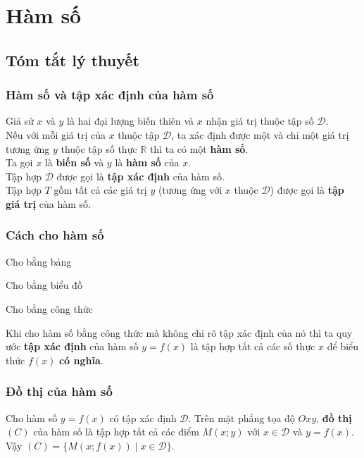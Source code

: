 \section{Hàm số}

\subsection{Tóm tắt lý thuyết}
\subsubsection{Hàm số và tập xác định của hàm số}
\begin{dn}{}
	Giả sử $x$ và $y$ là hai đại lượng biến thiên và $x$ nhận giá trị thuộc tập số $\mathscr{D}$.\\
	Nếu với mỗi giá trị của $x$ thuộc tập $\mathscr{D}$, ta xác định được một và chỉ một giá trị tương ứng $y$ thuộc tập số thực $\mathbb{R}$ thì ta có một \textbf{hàm số}. \\
	Ta gọi $x$ là \textbf{biến số} và $y$ là \textbf{hàm số} của $x$.\\
	Tập hợp $\mathscr{D}$ được gọi là \textbf{tập xác định} của hàm số.\\
	Tập hợp $T$ gồm tất cả các giá trị $y$ (tương ứng với $x$ thuộc $\mathscr{D}$) được gọi là \textbf{tập giá trị} của hàm số.
\end{dn}

\subsubsection{Cách cho hàm số}

\begin{listEX}[3]
	\item Cho bằng bảng
	\item Cho bằng biểu đồ
	\item Cho bằng công thức
\end{listEX}

\begin{note}
	Khi cho hàm số bằng công thức mà không chỉ rõ tập xác định của nó thì ta quy ước \textbf{tập xác định} của hàm số $y=f(x)$ là tập hợp tất cả các số thực $x$ để biểu thức $f(x)$ \textbf{có nghĩa}.
\end{note}

\subsubsection{Đồ thị của hàm số}
\begin{dn}{}
	Cho hàm số $y=f(x)$ có tập xác định $\mathscr{D}$. Trên mặt phẳng tọa độ $Oxy$, \textbf{đồ thị} $(C)$ của hàm số là tập hợp tất cả các điểm $M(x;y)$ với $x\in\mathscr{D}$ và $y=f(x)$.\\
	Vậy $(C)=\{M(x;f(x))\mid x\in\mathscr{D}\}$.
\end{dn}

